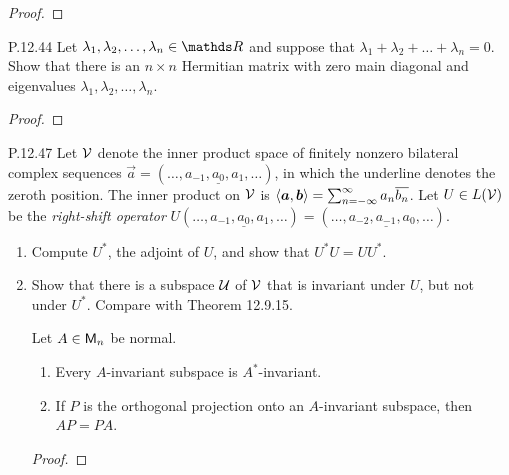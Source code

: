 \documentclass{../homework}
\begin{document}
\begin{problems}
  \begin{solution}
    \begin{proof}

    \end{proof}
  \end{solution}

\item[P.12.44] Let \(\lambda_1, \lambda_2, \dots, \lambda_n \in \RR\)
  and suppose that \(\lambda_1 + \lambda_2 + \dots + \lambda_n = 0\).
  Show that there is an \(n \times n\) Hermitian matrix with zero main
  diagonal and eigenvalues \(\lambda_1, \lambda_2, \dots, \lambda_n\).

  \begin{solution}
    \begin{proof}

    \end{proof}
  \end{solution}

\item[P.12.47] Let \(\mathcal{V}\) denote the inner product space of
  finitely nonzero bilateral complex sequences
  \(\vec a = (\dots, a_{-1}, \underline{a_0}, a_1, \dots)\), in which
  the underline denotes the zeroth position.  The inner product on
  \(\mathcal{V}\) is
  \(\inner{\vec a, \vec b} = \sum_{n=-\infty}^{\infty} a_n
  \overline{b_n}\).  Let \(U \in L(\mathcal{V})\) be the \emph{right-shift
    operator}
  \(U(\dots, a_{-1}, \underline{a_0}, a_1, \dots) = (\dots, a_{-2},
  \underline{a_{-1}}, a_0, \dots).\)
  \begin{enumerate}
  \item Compute \(U^*\), the adjoint of \(U\), and show that
    \(U^* U = U U^*\).

    \begin{solution}

    \end{solution}

  \item Show that there is a subspace \(\mathcal{U}\) of \(\mathcal{V}\) that
    is invariant under \(U\), but not under \(U^*\).  Compare with
    Theorem 12.9.15.

    \begin{booktheorem}[12.9.15]
      Let \(A \in \mathsf{M}_n\) be normal.
      \begin{enumerate}
      \item Every \(A\)-invariant subspace is \(A^*\)-invariant.
      \item If \(P\) is the orthogonal projection onto an
        \(A\)-invariant subspace, then \(AP = PA\).
      \end{enumerate}
    \end{booktheorem}

    \begin{solution}
      \begin{proof}

      \end{proof}
    \end{solution}
  \end{enumerate}
\end{problems}
\end{document}
